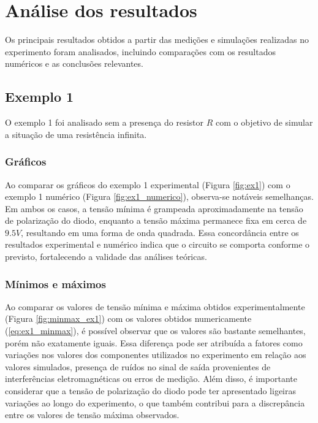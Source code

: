 \section{Análise dos resultados}

Os principais resultados obtidos a partir das medições e simulações realizadas no experimento foram analisados, incluindo comparações com os resultados numéricos e as conclusões relevantes.

\subsection{Exemplo 1}

O exemplo 1 foi analisado sem a presença do resistor $R$ com o objetivo de simular a situação de uma resistência infinita.

\subsubsection{Gráficos}

Ao comparar os gráficos do exemplo 1 experimental (Figura \ref{fig:ex1}) com o exemplo 1 numérico (Figura \ref{fig:ex1_numerico}), observa-se notáveis semelhanças. Em ambos os casos, a tensão mínima é grampeada aproximadamente na tensão de polarização do diodo, enquanto a tensão máxima permanece fixa em cerca de $9.5V$, resultando em uma forma de onda quadrada. Essa concordância entre os resultados experimental e numérico indica que o circuito se comporta conforme o previsto, fortalecendo a validade das análises teóricas.

\subsubsection{Mínimos e máximos}

Ao comparar os valores de tensão mínima e máxima obtidos experimentalmente (Figura \ref{fig:minmax_ex1}) com os valores obtidos numericamente (\ref{eq:ex1_minmax}), é possível observar que os valores são bastante semelhantes, porém não exatamente iguais. Essa diferença pode ser atribuída a fatores como variações nos valores dos componentes utilizados no experimento em relação aos valores simulados, presença de ruídos no sinal de saída provenientes de interferências eletromagnéticas ou erros de medição. Além disso, é importante considerar que a tensão de polarização do diodo pode ter apresentado ligeiras variações ao longo do experimento, o que também contribui para a discrepância entre os valores de tensão máxima observados.

